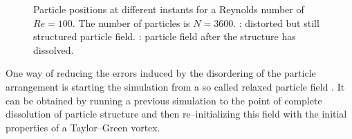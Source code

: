\documentclass[11pt,a4paper,twoside]{report}
\begin{document}
\begin{figure}[h]
\label{fig:results_TG_Re100_Positions}
\caption[Particle positions for Taylor--Green at $Re=100$]{Particle positions at different instants for a Reynolds number of $Re=100$. The number of particles is $N=3600$. : distorted but still structured particle field. : particle field after the structure has dissolved.} 
\end{figure}

One way of reducing the errors induced by the disordering of the particle arrangement is starting the simulation from a so called relaxed particle field \cite{Ellero2007}. It can be obtained by running a previous simulation to the point of complete dissolution of particle structure and then re--initializing this field with the initial properties of a Taylor--Green vortex. 
\end{document}
